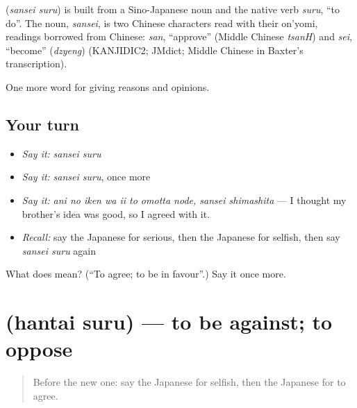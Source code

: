 \begin{cousinweb}
\textbf{} (\emph{sansei suru}) is built from a Sino-Japanese noun and the native verb \emph{suru}, \textquotedblleft{}to do\textquotedblright{}. The noun, \emph{sansei}, is two Chinese characters read with their on'yomi, readings borrowed from Chinese: \emph{san}, \textquotedblleft{}approve\textquotedblright{} (Middle Chinese \emph{tsanH}) and \emph{sei}, \textquotedblleft{}become\textquotedblright{} (\emph{dzyeng}) (KANJIDIC2; JMdict; Middle Chinese in Baxter's transcription).
\end{cousinweb}

\begin{grammarlens}[title={What you've built}]
One more word for giving reasons and opinions.
\end{grammarlens}

\subsection*{Your turn}
\begin{itemize}
\raggedright
  \item \emph{Say it:} \emph{sansei suru}
  \item \emph{Say it:} \emph{sansei suru}, once more
  \item \emph{Say it:} \emph{ani no iken wa ii to omotta node, sansei shimashita} — I thought my brother's idea was good, so I agreed with it.
  \item \emph{Recall:} say the Japanese for serious, then the Japanese for selfish, then say \emph{sansei suru} again
\end{itemize}

\begin{tcolorbox}[breakable,colback=teal!4,colframe=teal!35!black,title={Before you move on}]
What does  mean? (\textquotedblleft{}To agree; to be in favour\textquotedblright{}.) Say it once more.
\end{tcolorbox}
\section[\texorpdfstring{\ja{はんたいする} (hantai suru)}{はんたいする (hantai suru)}]{ (hantai suru) — to be against; to oppose}

\label{lesson:JA-C317-hantai-suru}



\begin{quote}
Before the new one: say the Japanese for selfish, then the Japanese for to agree.
\end{quote}

